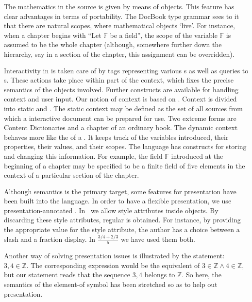 The mathematics in the {\MathDox} source is given by means of {\openmath} objects.  This
feature has clear advantages in terms of portability. The DocBook type grammar sees to it
that there are natural scopes, where mathematical objects `live'. For instance, when a
chapter begins with ``Let $\mathbb{F}$ be a field'', the scope of the variable
$\mathbb{F}$ is assumed to be the whole chapter (although, somewhere further down the
hierarchy, say in a section of the chapter, this assignment can be overridden).

Interactivity in {\MathDox} is taken care of by {\xml} tags representing various
{s} as well as queries to
{s}.  These actions take place within part of
the context, which fixes the precise semantics of the objects involved.  Further
constructs are available for handling context and user input.  Our notion of context is
based on \cite{FraHes:aoidms99}. Context is divided into static and
{}. The static context may be defined as the set of all {\xml}
sources from which a interactive document can be prepared for use. Two extreme forms are
{\openmath} Content Dictionaries and a chapter of an ordinary
book.  The dynamic context behaves more like the {} of a {\CAS}.  It
keeps track of the variables introduced, their properties, their values, and their scopes.
The {\MathDox} language has constructs for storing and changing this information.  For
example, the field $\mathbb{F}$ introduced at the beginning of a chapter may be specified
to be a finite field of five elements in the context of a particular section of the
chapter.

Although semantics is the primary target, some features for presentation have been built
into the language.  In order to have a flexible presentation, we use
presentation-annotated {\openmath}.  In \MathDox\ we allow style attributes inside
{\openmath} objects.  By discarding these style attributes, regular {\openmath} is
obtained. For instance, by providing the appropriate value for the style attribute, the
author has a choice between a slash and a fraction display. In $\frac{3/4+2/3}{5}$ we have
used them both.

Another way of solving presentation issues is illustrated by the statement:
$3,4\in\mathbb{Z}$.  The corresponding {\openmath} expression would be the equivalent of
$3\in\mathbb{Z} \wedge 4\in\mathbb{Z}$, but our {\openmath} statement reads that the
sequence $3,4$ belongs to $\mathbb{Z}$.  So here, the semantics of the element-of symbol
has been stretched so as to help out presentation.



